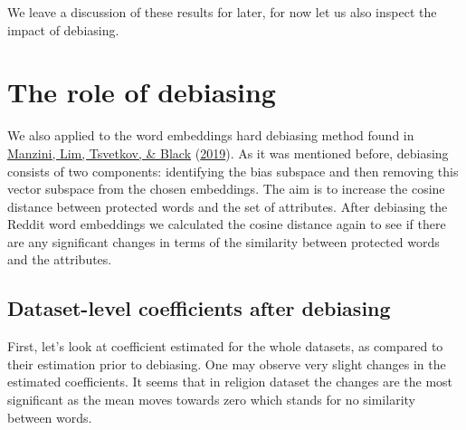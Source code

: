 \documentclass[
  12pt,
]{book}
\begin{document}
We leave a discussion of these results for later, for now let us also inspect the impact of debiasing.

\hypertarget{the-role-of-debiasing}{%
\chapter{The role of debiasing}\label{the-role-of-debiasing}}

We also applied to the word embeddings hard debiasing method found in \protect\hyperlink{ref-Manzini2019blackToCriminal}{Manzini, Lim, Tsvetkov, \& Black} (\protect\hyperlink{ref-Manzini2019blackToCriminal}{2019}). As it was mentioned before, debiasing consists of two components: identifying the bias subspace and then removing this vector subspace from the chosen embeddings. The aim is to increase the cosine distance between protected words and the set of attributes.
After debiasing the Reddit word embeddings we calculated the cosine distance again to see if there are any significant changes in terms of the similarity between protected words and the attributes.

\hypertarget{dataset-level-coefficients-after-debiasing}{%
\section{Dataset-level coefficients after debiasing}\label{dataset-level-coefficients-after-debiasing}}

First, let's look at coefficient estimated for the whole datasets, as compared to their estimation prior to debiasing. One may observe very slight changes in the estimated coeﬀicients. It seems that in religion dataset the changes are the most significant as the mean moves towards zero which stands for no similarity between words.
\end{document}
